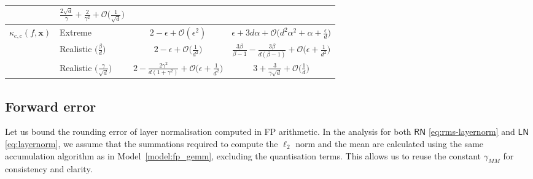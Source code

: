 \documentclass[namedate,webpdf,imanum]{ima-authoring-template}
\newcommand{\Layer}[1]{\mathsf{#1}}
\newcommand{\cond}[3][]{\kappa_{\mathrm{#2}} #1( #3 #1)}
\newcommand{\Oh}[2][]{\mathcal{O}#1( #2 #1)}
\numberwithin{equation}{section}
\begin{document}
\begin{table}[t]
\begin{tabular}{@{}llcc@{}}
& $\frac{2\sqrt{d}}{\gamma} + \frac{2}{\gamma^2} + \Oh[\Big]{\frac{1}{\sqrt{d}}}$ \\
\midrule
$\cond{c,c}{f,\mathbf{x}}$
& Extreme
& $2 - \epsilon + \Oh{\epsilon^2}$
& $\epsilon + 3d\alpha + \Oh[\Big]{d^2\alpha^2 + \alpha + \frac{\epsilon}{d}}$ \\
%
& Realistic $\Big(\tfrac{\beta}{d}\Big)$
& $2 - \epsilon + \Oh[\Big]{\frac{1}{d^2}}$
& $\frac{3\beta}{\beta-1} - \frac{3\beta}{d(\beta-1)} + \Oh[\Big]{\epsilon + \frac{1}{d^2}}$ \\
%
& Realistic $\Big(\tfrac{\gamma}{\sqrt{d}}\Big)$
& $2 - \frac{2\gamma^2}{d(1+\gamma^2)} + \Oh[\Big]{\epsilon + \frac{1}{d^2}}$
& $3 + \frac{3}{\gamma \sqrt{d}} + \Oh[\Big]{\frac{1}{d}}$ \\
\midrule
\end{tabular}
\end{table}

\subsection{Forward error}
Let us bound the rounding error of layer normalisation computed in FP arithmetic.
In the analysis for both $\Layer{RN}$ \eqref{eq:rms-layernorm} and $\Layer{LN}$ \eqref{eq:layernorm}, we assume that the summations required to compute the $\ell_2$ norm and the mean are calculated using the same accumulation algorithm as in Model~\ref{model:fp_gemm}, excluding the quantisation terms.
This allows us to reuse the constant $\gamma_{MM}$ for consistency and clarity.
\end{document}
